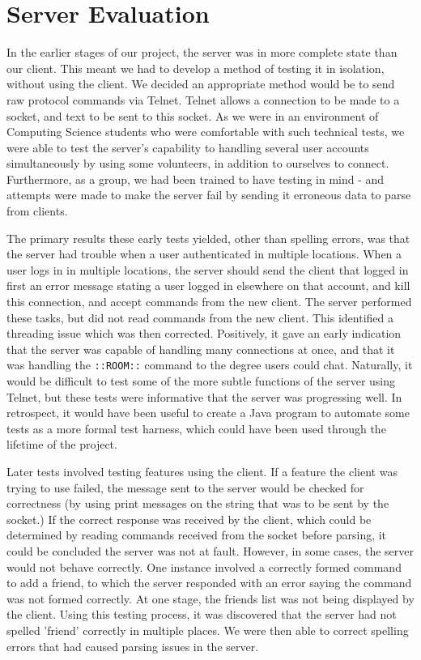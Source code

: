 \section{Server Evaluation}
\label{server_eval}

In the earlier stages of our project, the server was in more complete state than our client. This meant we had to develop a method of testing it in isolation, without using the client. We decided an appropriate method would be to send raw protocol commands via Telnet. Telnet allows a connection to be made to a socket, and text to be sent to this socket. As we were in an environment of Computing Science students who were comfortable with such technical tests, we were able to test the server's capability to handling several user accounts simultaneously by using some volunteers, in addition to ourselves to connect. Furthermore, as a group, we had been trained to have testing in mind - and attempts were made to make the server fail by sending it erroneous data to parse from clients.

The primary results these early tests yielded, other than spelling errors, was that the server had trouble when a user authenticated in multiple locations. When a user logs in in multiple locations, the server should send the client that logged in first an error message stating a user logged in elsewhere on that account, and kill this connection, and accept commands from the new client. The server performed these tasks, but did not read commands from the new client. This identified a threading issue which was then corrected. Positively, it gave an early indication that the server was capable of handling many connections at once, and that it was handling the \texttt{::ROOM::} command to the degree users could chat. Naturally, it would be difficult to test some of the more subtle functions of the server using Telnet, but these tests were informative that the server was progressing well. In retrospect, it would have been useful to create a Java program to automate some tests as a more formal test harness, which could have been used through the lifetime of the project. 	

Later tests involved testing features using the client. If a feature the client was trying to use failed, the message sent to the server would be checked for correctness (by using print messages on the string that was to be sent by the socket.) If the correct response was received by the client, which could be determined by reading commands received from the socket before parsing, it could be concluded the server was not at fault. However, in some cases, the server would not behave correctly. One instance involved a correctly formed command to add a friend, to which the server responded with an error saying the command was not formed correctly. At one stage, the friends list was not being displayed by the client. Using this testing process, it was discovered that the server had not spelled 'friend' correctly in multiple places. We were then able to correct spelling errors that had caused parsing issues in the server. 

